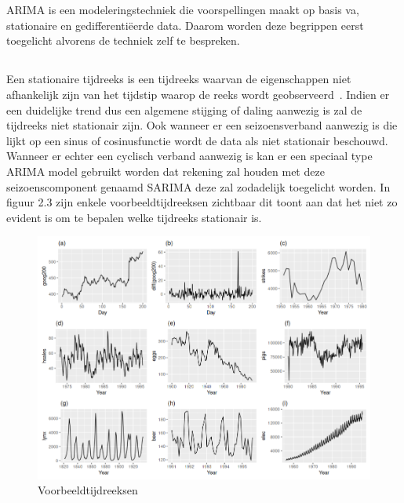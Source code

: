 \section{}
\label{sec: Theoretische toelichting over ARIMA}

ARIMA is een modeleringstechniek die voorspellingen maakt op basis va, stationaire en gedifferenti\"{e}erde data. Daarom worden deze begrippen eerst toegelicht alvorens de techniek zelf te bespreken. 

\subsection{}

Een stationaire tijdreeks is een tijdreeks waarvan de eigenschappen niet afhankelijk zijn van het tijdstip waarop de reeks wordt geobserveerd~\autocite{Hyndman2018}. Indien er een duidelijke trend dus een algemene stijging of daling aanwezig is zal de tijdreeks niet stationair zijn. Ook wanneer er een seizoensverband aanwezig is die lijkt op een sinus of cosinusfunctie wordt de data als niet stationair beschouwd. Wanneer er echter een cyclisch verband aanwezig is kan er een speciaal type ARIMA model gebruikt worden dat rekening zal houden met deze seizoenscomponent genaamd SARIMA deze zal zodadelijk toegelicht worden.
In figuur 2.3 zijn enkele voorbeeldtijdreeksen zichtbaar dit toont aan dat het niet zo evident is om te bepalen welke tijdreeks stationair is.

\begin{figure}[!h]
    \centering
    \caption{Voorbeeldtijdreeksen~\autocite{Hyndman2018}}
    \label{fig:stationarity}
    \includegraphics[width=0.7\linewidth]{stationarity}
\end{figure}

